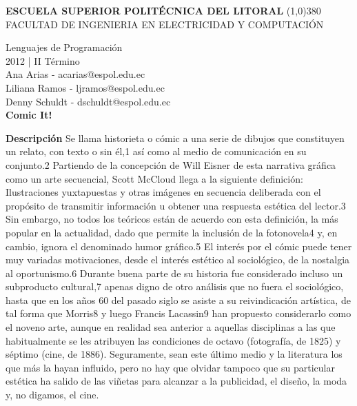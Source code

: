 \documentclass[12pt]{report}
\begin{document}
	\setlength{\topmargin}{-0.5in}
	\pagestyle{empty}
	\begin{center}
		\textbf{
			\vspace{-0.7em}
			ESCUELA SUPERIOR POLITÉCNICA DEL LITORAL
		}
		\line(1,0){380}\\		
		\scriptsize{FACULTAD DE INGENIERIA EN ELECTRICIDAD Y COMPUTACIÓN}
	\end{center}
	\begin{center}
		\vspace{2.5em}
		Lenguajes de Programación
		\\2012 | II Término
		\vspace{1.5em}
		\\Ana Arias - acarias@espol.edu.ec
		\\Liliana Ramos - ljramos@espol.edu.ec
		\\Denny Schuldt - dschuldt@espol.edu.ec
		\vspace{3em}
		\Large{\textbf{\\Comic It!	\vspace{2em}}}
	\end{center}
	\begingroup
		\large{
			\textbf{
				Descripción
				\newline
				\newline
			}
		}
	\endgroup
	Se llama historieta o cómic a una serie de dibujos que constituyen un relato, con texto o sin él,1 así como al medio de comunicación en su conjunto.2 Partiendo de la concepción de Will Eisner de esta narrativa gráfica como un arte secuencial, Scott McCloud llega a la siguiente definición: Ilustraciones yuxtapuestas y otras imágenes en secuencia deliberada con el propósito de transmitir información u obtener una respuesta estética del lector.3 Sin embargo, no todos los teóricos están de acuerdo con esta definición, la más popular en la actualidad, dado que permite la inclusión de la fotonovela4 y, en cambio, ignora el denominado humor gráfico.5
El interés por el cómic puede tener muy variadas motivaciones, desde el interés estético al sociológico, de la nostalgia al oportunismo.6 Durante buena parte de su historia fue considerado incluso un subproducto cultural,7 apenas digno de otro análisis que no fuera el sociológico, hasta que en los años 60 del pasado siglo se asiste a su reivindicación artística, de tal forma que Morris8 y luego Francis Lacassin9 han propuesto considerarlo como el noveno arte, aunque en realidad sea anterior a aquellas disciplinas a las que habitualmente se les atribuyen las condiciones de octavo (fotografía, de 1825) y séptimo (cine, de 1886). Seguramente, sean este último medio y la literatura los que más la hayan influido, pero no hay que olvidar tampoco que su particular estética ha salido de las viñetas para alcanzar a la publicidad, el diseño, la moda y, no digamos, el cine.
\end{document}

